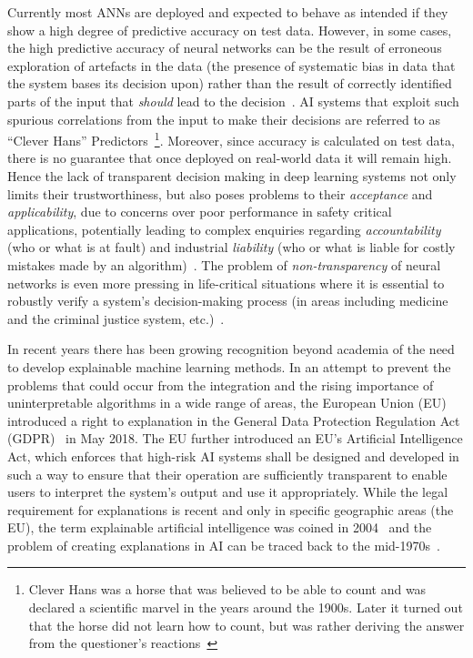 Currently most ANNs are deployed and expected to behave as intended if they show a high degree of predictive accuracy on test data. However, in some cases, the high predictive accuracy of  neural networks can be the result of erroneous exploration of artefacts in the data (\ie the presence of systematic bias in data that the system bases its decision upon) rather than the result of correctly identified parts of the input that \textit{should} lead to the decision~\cite{leek2010tackling, SzegedyZSBEGF13, corr, taylor2006methods}. AI systems that exploit such spurious correlations from the input to make their decisions are referred to as ``Clever Hans'' Predictors~\footnote{Clever Hans was a horse that was believed to be able to count and was declared a scientific marvel in the years around the 1900s. Later it turned out that the horse did not learn how to count, but was rather deriving the answer from the questioner's reactions~\cite{lapuschkin2019unmasking}}. Moreover, since accuracy is calculated on test data, there is no guarantee that once deployed on real-world data it will remain high. Hence the lack of transparent decision making in deep learning systems not only limits their trustworthiness, but also poses problems to their \emph{acceptance} and \emph{applicability}, due to concerns over poor performance in safety critical applications, potentially leading to complex enquiries regarding \emph{accountability} (\ie who or what is at fault) and industrial \emph{liability} (\ie who or what is liable for costly mistakes made by an algorithm)~\cite{NguyenHHTK14, abs, kucharski2016study, WolfMG17}. The problem of \emph{non-transparency} of neural networks is even more pressing in life-critical situations where it is essential to robustly verify a system's decision-making process (\eg in areas including medicine and the criminal justice system, etc.)~\cite{CaruanaLGKSE15, BojarskiYCCFJM17}.

In recent years there has been growing recognition beyond academia of the need to develop explainable machine learning methods. In an attempt to prevent the problems that could occur from the integration and the rising importance of uninterpretable algorithms in a wide range of areas, the European Union (EU) introduced a right to explanation in the General Data Protection Regulation Act (GDPR)~\cite{GoodmanF17} in May 2018. The EU further introduced an EU’s Artificial Intelligence Act, which enforces that high-risk AI systems shall be designed and developed in such a way to ensure that their operation are sufficiently transparent to enable users to interpret the system’s output and use it appropriately. While the legal requirement for explanations is recent and only in specific geographic areas (the EU), the term explainable artificial intelligence was coined in 2004~\cite{LentFM04} and the problem of creating explanations in AI can be traced back to the mid-1970s~\cite{moore1988explanation}. 


